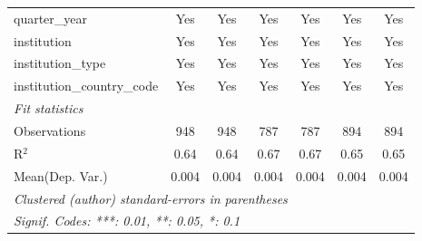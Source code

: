 \begin{tabular}{lcccccc}
   quarter\_year                      & Yes     & Yes     & Yes     & Yes     & Yes     & Yes\\  
   institution                        & Yes     & Yes     & Yes     & Yes     & Yes     & Yes\\  
   institution\_type                  & Yes     & Yes     & Yes     & Yes     & Yes     & Yes\\  
   institution\_country\_code         & Yes     & Yes     & Yes     & Yes     & Yes     & Yes\\  
   \midrule
   \emph{Fit statistics}\\
   Observations                       & 948     & 948     & 787     & 787     & 894     & 894\\  
   R$^2$                              & 0.64    & 0.64    & 0.67    & 0.67    & 0.65    & 0.65\\  
Mean(Dep. Var.) & 0.004 & 0.004 & 0.004 & 0.004 & 0.004 & 0.004 \\
   \midrule \midrule
   \multicolumn{7}{l}{\emph{Clustered (author) standard-errors in parentheses}}\\
   \multicolumn{7}{l}{\emph{Signif. Codes: ***: 0.01, **: 0.05, *: 0.1}}\\
\end{tabular}
\par\endgroup
